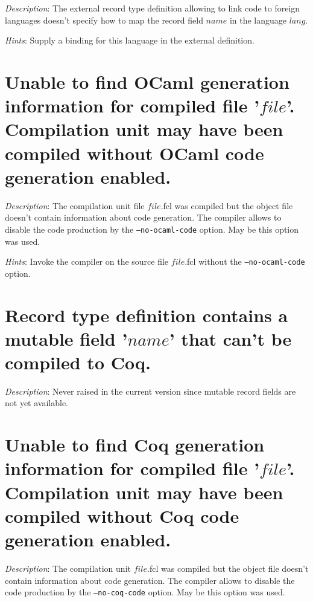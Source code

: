 {\em Description}: The external record type definition allowing to
link {\focal} code to foreign languages doesn't specify how to map the
record field $name$ in the language $lang$.

{\em Hints}: Supply a binding for this language in the external
definition.



\section*{Unable to find OCaml generation information for compiled
  file '$file$'. Compilation unit may have been compiled without OCaml code
  generation enabled.}

{\em Description}: The {\focal} compilation unit file $file$.fcl was compiled but
the object file doesn't contain information about {\ocaml} code
generation. The {\focal} compiler allows to disable the {\ocaml} code
production by the {\tt --no-ocaml-code} option. May be this option was used.

{\em Hints}: Invoke the compiler on the source file $file$.fcl without
the {\tt --no-ocaml-code} option.



\section*{Record type definition contains a mutable field '$name$' that can't
  be compiled to Coq.}

{\em Description}: {\color{red} Never raised in the current version
  since mutable record fields are not yet available}.



\section*{Unable to find Coq generation information for compiled file
  '$file$'. Compilation unit may have been compiled without Coq code
  generation enabled.}

{\em Description}: The {\focal} compilation unit $file$.fcl was
compiled but the object file doesn't contain information about {\coq}
code generation. The {\focal} compiler allows to disable the {\coq} code
production by the {\tt --no-coq-code} option. May be this option was
used.

